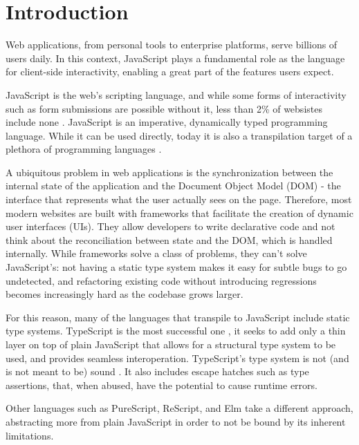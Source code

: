 \chapter*{Introduction}
\setcounter{page}{1}

Web applications, from personal tools to enterprise platforms, serve billions of users daily. In this context, JavaScript plays a fundamental role as the language for client-side interactivity, enabling a great part of the features users expect.

JavaScript is the web's scripting language, and while some forms of interactivity such as form submissions are possible without it, less than 2\% of websistes include none \cite{noauthor_usage_nodate}. JavaScript is an imperative, dynamically typed programming language. While it can be used directly, today it is also a transpilation target of a plethora of programming languages \cite{noauthor_list_nodate}.

A ubiquitous problem in web applications is the synchronization between the internal state of the application and the Document Object Model (DOM) - the interface that represents what the user actually sees on the page. Therefore, most modern websites are built with frameworks that facilitate the creation of dynamic user interfaces (UIs). They allow developers to write declarative code and not think about the reconciliation between state and the DOM, which is handled internally. While frameworks solve a class of problems, they can't solve JavaScript's: not having a static type system makes it easy for subtle bugs to go undetected, and refactoring existing code without introducing regressions becomes increasingly hard as the codebase grows larger.

For this reason, many of the languages that transpile to JavaScript include static type systems. TypeScript is the most successful one \cite{noauthor_most_nodate}, it seeks to add only a thin layer on top of plain JavaScript that allows for a structural type system to be used, and provides seamless interoperation. TypeScript's type system is not (and is not meant to be) sound \cite{noauthor_typescript_nodate}. It also includes escape hatches such as type assertions, that, when abused, have the potential to cause runtime errors.

Other languages such as PureScript, ReScript, and Elm take a different approach, abstracting more from plain JavaScript in order to not be bound by its inherent limitations.

